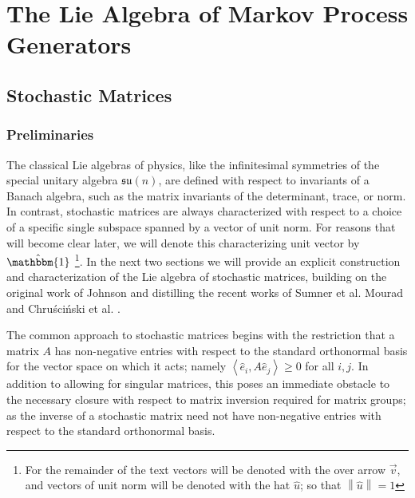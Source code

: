 \chapter{The Lie Algebra of Markov Process Generators}
\section{Stochastic Matrices}
\subsection{Preliminaries}
The classical Lie algebras of physics, like the infinitesimal symmetries of the special
unitary algebra $\mathfrak{su}(n)$, are defined with respect to invariants of a Banach
algebra, such as the matrix invariants of the determinant, trace, or norm. In contrast,
stochastic matrices are always characterized with respect to a choice of a specific single
subspace spanned by a vector of unit norm. For reasons that will become clear later, we will
denote this characterizing unit vector by $\hat{\mathbbm{1}}$
\footnote{For the remainder of the text vectors will be denoted with the over arrow $\vec{v}$, and vectors of unit norm will be denoted with the hat $\hat{u}$; so that $\left\| \hat{u} \right\| = 1$}. In the next two sections we 
will provide an explicit construction and characterization of the Lie algebra of stochastic 
matrices, building on the original work of Johnson \cite{johnson_markov-type_1985} and
distilling the recent works of Sumner et al. \cite{sumner_lie_2012,fernandez-sanchez_lie_2012} 
Mourad \cite{mourad_lie-theoretic_2004} and Chruściński et al. \cite{chruscinski_pseudo-stochastic_2015}.

The common approach to stochastic matrices begins with the restriction that a matrix $A$ has 
non-negative entries with respect to the standard orthonormal basis for the vector space on 
which it acts; namely $\left\langle\hat{e}_i,A \hat{e}_j\right\rangle \ge 0$ for all $i,j$. 
In addition to allowing for singular matrices, this poses an immediate obstacle to the 
necessary closure with respect to matrix inversion required for matrix groups; as the 
inverse of a stochastic matrix need not have non-negative entries with respect to the
standard orthonormal basis. 

